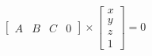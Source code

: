 \documentclass{article}
\begin{document}
\thispagestyle{empty}

$$
 \begin{bmatrix}A & B & C & 0\end{bmatrix} \times \begin{bmatrix}x \\ y \\ z\\1\end{bmatrix}  = 0
$$
\end{document}
